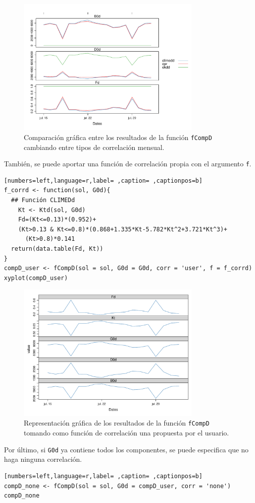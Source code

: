 \begin{itemize}
\begin{itemize}
\begin{figure}[!htb]
\centering
\includegraphics[width=0.8\textwidth]{figuras/codigo-fcompddia.pdf}
\caption{Comparación gráfica entre los resultados de la función \texttt{fCompD} cambiando entre tipos de correlación mensual.}
\end{figure}
También, se puede aportar una función de correlación propia con el argumento \texttt{f}.
\begin{lstlisting}[numbers=left,language=r,label= ,caption= ,captionpos=b]
f_corrd <- function(sol, G0d){
  ## Función CLIMEDd
    Kt <- Ktd(sol, G0d)
    Fd=(Kt<=0.13)*(0.952)+
    (Kt>0.13 & Kt<=0.8)*(0.868+1.335*Kt-5.782*Kt^2+3.721*Kt^3)+
      (Kt>0.8)*0.141
  return(data.table(Fd, Kt))
}
compD_user <- fCompD(sol = sol, G0d = G0d, corr = 'user', f = f_corrd)
xyplot(compD_user)
\end{lstlisting}

\begin{figure}[!htb]
\centering
\includegraphics[width=0.8\textwidth]{figuras/codigo-fcompduser.pdf}
\caption{Representación gráfica de los resultados de la función \texttt{fCompD} tomando como función de correlación una propuesta por el usuario.}
\end{figure}
\FloatBarrier
Por último, si \texttt{G0d} ya contiene todos los componentes, se puede especifica que no haga ninguna correlación.
\begin{lstlisting}[numbers=left,language=r,label= ,caption= ,captionpos=b]
compD_none <- fCompD(sol = sol, G0d = compD_user, corr = 'none')
compD_none
\end{lstlisting}


\end{itemize}
\end{itemize}
